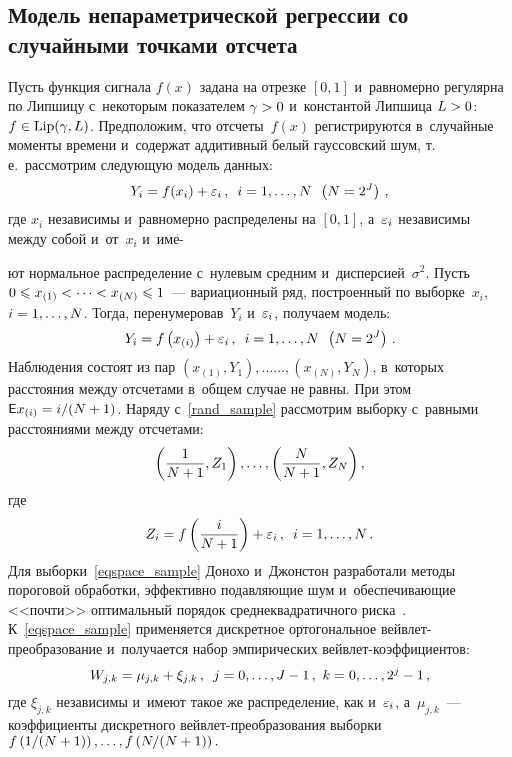 \begin{multicols}{2}
\section{Модель непараметрической регрессии со случайными точками отсчета}

\vspace*{-2pt}

Пусть функция сигнала $f(x)$ задана на отрезке $[0,1]$ и~равномерно 
регулярна по Липшицу с~некоторым показателем $\gamma\hm>0$ и~константой Липшица $L\hm>0$: 
$f\hm\in\mathrm{Lip}(\gamma,L)$. Предположим, что отсчеты~$f(x)$ 
регистрируются в~случайные моменты времени и~содержат аддитивный белый 
гауссовский шум, т.\,е.\ рассмотрим следующую модель данных:
$$
Y_i=f(x_i)+\varepsilon_i\,,\enskip i=1,\ldots,N\enskip \left(N=2^J\right)\,,
$$
где $x_i$ независимы и~равномерно распределены на $[0,1]$, а~$\varepsilon_i$ 
независимы между собой и~от~$x_i$ и~име-\linebreak\vspace*{-12pt}

\pagebreak

\noindent
ют нормальное распределение с~нулевым 
средним и~дисперсией~$\sigma^2$. Пусть $0\hm\leqslant x_{(1)}<\cdots< x_{(N)}\hm\leqslant 1$~--- 
вариационный ряд, построенный по выборке~$x_i$, $i\hm=1,\ldots,N$. Тогда, 
перенумеровав~$Y_i$ и~$\varepsilon_i$, получаем модель:
\begin{equation}
\label{rand_sample}
Y_i=f\left(x_{(i)}\right)+\varepsilon_i\,,\enskip i=1,\ldots,N\enskip \left(N=2^J\right)\,.
\end{equation}
Наблюдения состоят из пар $(x_{(1)},Y_1),\ldots$\linebreak $\ldots, (x_{(N)},Y_N)$, 
в~которых расстояния между отсчетами в~общем случае не равны. При этом
 $\e x_{(i)}\hm=i/(N+1)$. Наряду с~\eqref{rand_sample} рассмотрим выборку 
 с~равными расстояниями между отсчетами:
\begin{equation}
\label{eqspace_sample}
\left(\displaystyle\frac{\displaystyle 1\mathstrut}{\displaystyle N+1\mathstrut},Z_1\right),\ldots, \left(\displaystyle\frac{\displaystyle N\mathstrut}{\displaystyle N+1\mathstrut},Z_N\right),
\end{equation}
где
\begin{equation*}
Z_i=f\left(\displaystyle\frac{\displaystyle i\mathstrut}{\displaystyle N+1\mathstrut}\right)+\varepsilon_i\,,\enskip i=1,\ldots,N\,.
\end{equation*}
Для выборки~\eqref{eqspace_sample} Донохо и~Джонстон разработали методы 
пороговой обработки, эффективно по\-дав\-ля\-ющие шум и~обеспечивающие <<почти>> 
оптимальный порядок среднеквадратичного риска~\cite{DonJ94}. 
К~\eqref{eqspace_sample} применяется дискретное ортогональное вейв\-лет-пре\-обра\-зо\-ва\-ние 
и~получается набор эмпирических вейв\-лет-ко\-эф\-фи\-ци\-ентов:
$$
W_{j,k}=\mu_{j,k}+\xi_{j,k}\,,\enskip j=0,\ldots,J-1\,,\ k=0,\ldots,2^{j}-1\,,
$$
где $\xi_{j,k}$ независимы и~имеют такое же распределение, как и~$\varepsilon_i$, 
а~$\mu_{j,k}$~--- коэффициенты дискретного вейв\-лет-пре\-обра\-зо\-ва\-ния выборки
$f\left({1}/({N\hm+1})\right),\ldots, f\left({N}/({N\hm+1})\right).$


\end{multicols}
